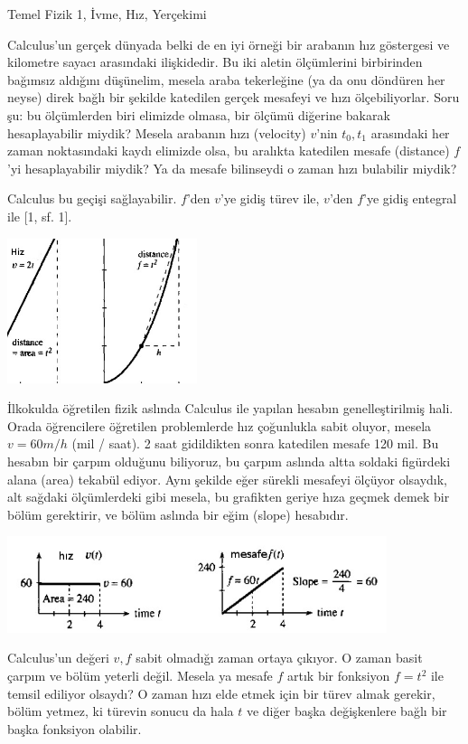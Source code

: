 \documentclass[12pt,fleqn]{article}\usepackage{../../common}
\begin{document}
Temel Fizik 1, İvme, Hız, Yerçekimi

Calculus'un gerçek dünyada belki de en iyi örneği bir arabanın hız
göstergesi ve kilometre sayacı arasındaki ilişkidedir. Bu iki aletin
ölçümlerini birbirinden bağımsız aldığını düşünelim, mesela araba
tekerleğine (ya da onu döndüren her neyse) direk bağlı bir şekilde
katedilen gerçek mesafeyi ve hızı ölçebiliyorlar. Soru şu: bu ölçümlerden
biri elimizde olmasa, bir ölçümü diğerine bakarak hesaplayabilir miydik?
Mesela arabanın hızı (velocity) $v$'nin $t_0,t_1$ arasındaki her zaman
noktasındaki kaydı elimizde olsa, bu aralıkta katedilen mesafe (distance)
$f$'yi hesaplayabilir miydik?  Ya da mesafe bilinseydi o zaman hızı
bulabilir miydik?

Calculus bu geçişi sağlayabilir. $f$'den $v$'ye gidiş türev ile, $v$'den
$f$'ye gidiş entegral ile [1, sf. 1]. 

\includegraphics[width=15em]{phy_005_basics_01_01.jpg}

İlkokulda öğretilen fizik aslında Calculus ile yapılan hesabın
genelleştirilmiş hali. Orada öğrencilere öğretilen problemlerde hız
çoğunlukla sabit oluyor, mesela $v = 60 m/h$ (mil / saat). 2 saat
gidildikten sonra katedilen mesafe 120 mil. Bu hesabın bir çarpım olduğunu
biliyoruz, bu çarpım aslında altta soldaki figürdeki alana (area) tekabül
ediyor. Aynı şekilde eğer sürekli mesafeyi ölçüyor olsaydık, alt sağdaki
ölçümlerdeki gibi mesela, bu grafikten geriye hıza geçmek demek bir bölüm
gerektirir, ve bölüm aslında bir eğim (slope) hesabıdır.

\includegraphics[width=30em]{phy_005_basics_01_02.jpg}

Calculus'un değeri $v,f$ sabit olmadığı zaman ortaya çıkıyor. O zaman basit
çarpım ve bölüm yeterli değil. Mesela ya mesafe $f$ artık bir fonksiyon
$f=t^2$ ile temsil ediliyor olsaydı? O zaman hızı elde etmek için bir türev
almak gerekir, bölüm yetmez, ki türevin sonucu da hala $t$ ve diğer başka
değişkenlere bağlı bir başka fonksiyon olabilir.
\end{document}
